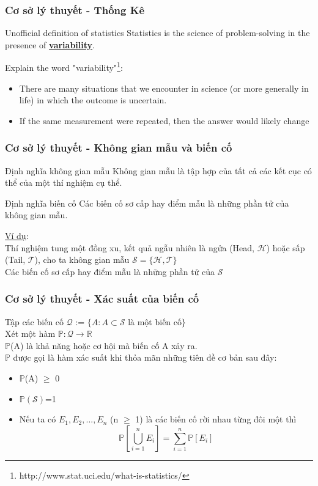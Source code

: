 \documentclass[t]{beamer}
\begin{document}
\begin{frame}
\frametitle{Cơ sở lý thuyết - Thống Kê}
\begin{block}{Unofficial definition of statistics}
Statistics is the science of problem-solving in the presence of \textbf{\underline{variability}}.
\end{block}
Explain the word "variability"\footnote{http://www.stat.uci.edu/what-is-statistics/}:
\begin{itemize}
\item There are many situations that we encounter in science (or more generally in life) in which the outcome is uncertain.
\item If the same measurement were repeated, then the answer would likely change
\end{itemize}
\end{frame}


\begin{frame}
\frametitle{Cơ sở lý thuyết - Không gian mẫu và biến cố}
\begin{block}{Định nghĩa không gian mẫu}
Không gian mẫu là tập hợp của tất cả các kết cục có thể của một thí nghiệm cụ thể.
\end{block}
\begin{block}{Định nghĩa biến cố}
Các biến cố sơ cấp hay điểm mẫu là những phần tử của không gian mẫu.
\end{block}
\underline{Ví dụ}:\\ 
Thí nghiệm tung một đồng xu, kết quả ngẫu nhiên là ngửa (Head, $\mathcal{H}$) hoặc sấp (Tail, $\mathcal{T}$), cho ta không gian mẫu $\mathcal{S= \{H,T}\}$\\
Các biến cố sơ cấp hay điểm mẫu là những phần tử của $\mathcal{S}$

\end{frame}



\begin{frame}[t]
\frametitle{Cơ sở lý thuyết - Xác suất của biến cố}
Tập các biến cố $\mathcal{Q}$ := $\{ A: A \subset \mathcal{S}$ là một biến cố$\}$\\
Xét một hàm $\mathbb{P}: \mathcal{Q} \rightarrow \mathbb{R}$\\
$\mathbb{P}$(A) là khả năng hoặc cơ hội mà biến cố A xảy ra.\\
$\mathbb{P}$ được gọi là hàm xác suất khi thỏa mãn những tiên đề cơ bản sau đây:\\
\begin{itemize}
\item $\mathbb{P}$(A) $\geq$ 0
\item $\mathbb{P}(\mathcal{S})$=1
\item Nếu ta có $E_{1}, E_{2},...,E_{n}$ (n $\geq$ 1) là các biến cố rời nhau từng đôi một thì\\
\[
\mathbb{P}\left[\bigcup_{i=1}^n E_{i}\right]=\sum_{i=1}^n \mathbb{P}[E_i]
\]
\end{itemize}
\end{frame}
\end{document}
